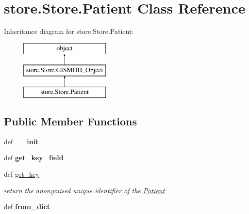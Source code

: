 \hypertarget{classstore_1_1_store_1_1_patient}{\section{store.\-Store.\-Patient Class Reference}
\label{classstore_1_1_store_1_1_patient}
}
Inheritance diagram for store.\-Store.\-Patient\-:\begin{figure}[H]
\begin{center}
\leavevmode
\includegraphics[height=3.000000cm]{classstore_1_1_store_1_1_patient}
\end{center}
\end{figure}
\subsection*{Public Member Functions}
\begin{DoxyCompactItemize}
\item 
\hypertarget{classstore_1_1_store_1_1_patient_ac8a2ecab27100f33c75fafa247298a97}{def {\bfseries \-\_\-\-\_\-init\-\_\-\-\_\-}}\label{classstore_1_1_store_1_1_patient_ac8a2ecab27100f33c75fafa247298a97}

\item 
\hypertarget{classstore_1_1_store_1_1_patient_a4dbaa068f510cf2686036a1fffc91fa9}{def {\bfseries get\-\_\-key\-\_\-field}}\label{classstore_1_1_store_1_1_patient_a4dbaa068f510cf2686036a1fffc91fa9}

\item 
\hypertarget{classstore_1_1_store_1_1_patient_a89d5fd5b6852bfd5efd4113ad12be491}{def \hyperlink{classstore_1_1_store_1_1_patient_a89d5fd5b6852bfd5efd4113ad12be491}{get\-\_\-key}}\label{classstore_1_1_store_1_1_patient_a89d5fd5b6852bfd5efd4113ad12be491}

\begin{DoxyCompactList}\small\item\em return the anonymised unique identifier of the \hyperlink{classstore_1_1_store_1_1_patient}{Patient} \end{DoxyCompactList}\item 
\hypertarget{classstore_1_1_store_1_1_patient_a44c7f2261c5c26138f88b1931d80b965}{def {\bfseries from\-\_\-dict}}\label{classstore_1_1_store_1_1_patient_a44c7f2261c5c26138f88b1931d80b965}

\end{DoxyCompactItemize}
